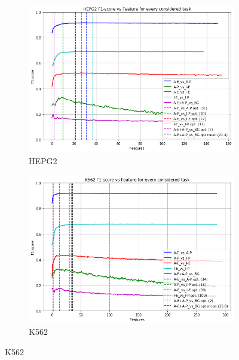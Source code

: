 \begin{figure}[!htb]
    \begin{subfigure}[b]{0.45\textwidth}
        \includegraphics[width=\textwidth]{images/features_plots/HEPG2_feature_plot.png}
        \caption{HEPG2}
        \label{fig:HEPG2_n_feat}
    \end{subfigure}
    \begin{subfigure}[b]{0.48\textwidth}
        \includegraphics[width=\textwidth]{images/features_plots/K562_feature_plot.png}
        \caption{K562}
        \label{fig:K562_n_feat}
    \end{subfigure}
    

\end{figure}
